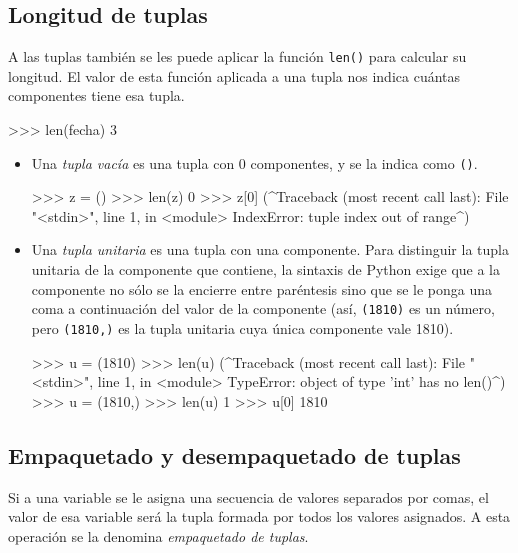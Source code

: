 \subsection{Longitud de tuplas}

A las tuplas también se les puede aplicar la función \lstinline+len()+
para calcular su longitud. El valor de esta función aplicada a
una tupla nos indica cuántas componentes tiene esa tupla.

\begin{codigo-python-sn}
>>> len(fecha)
3
\end{codigo-python-sn}


\begin{itemize}
\item Una \emph{tupla vacía} es una tupla con $0$ componentes, y se la
indica como \lstinline+()+.

\begin{codigo-python-sn}
>>> z = ()
>>> len(z)
0
>>> z[0]
(^Traceback (most recent call last):
  File "<stdin>", line 1, in <module>
IndexError: tuple index out of range^)
\end{codigo-python-sn}

\item Una \emph{tupla unitaria} es una tupla con una componente. Para
distinguir la tupla unitaria de la componente que contiene, la sintaxis de Python exige
que a la componente no sólo se la encierre entre paréntesis sino que se le
ponga una coma a continuación del valor de la componente (así,
\lstinline+(1810)+ es un número, pero \lstinline+(1810,)+ es la tupla
unitaria cuya única componente vale 1810).

\begin{codigo-python-sn}
>>> u = (1810)
>>> len(u)
(^Traceback (most recent call last):
  File "<stdin>", line 1, in <module>
TypeError: object of type 'int' has no len()^)
>>> u = (1810,)
>>> len(u)
1
>>> u[0]
1810
\end{codigo-python-sn}
\end{itemize}

\subsection{Empaquetado y desempaquetado de tuplas}
Si a una variable se le asigna una secuencia de valores separados por comas,
el valor de esa variable será la tupla formada por todos los valores asignados.
A esta operación se la denomina \emph{empaquetado de tuplas}.

